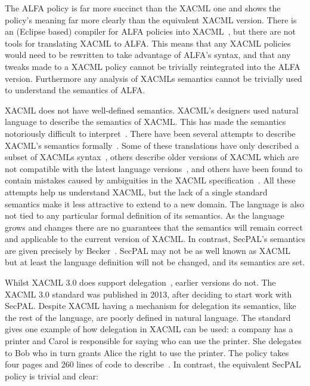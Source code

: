 \documentclass[thesis.tex]{subfiles}
\begin{document}
The ALFA policy is far more succinct than the XACML one and shows the
policy's meaning far more clearly than the equivalent XACML version.
There is an (Eclipse based) compiler for ALFA policies into
XACML~\cite{axiomaics_axiomatics_2012}, but there are not tools for
translating XACML to ALFA.  This means that any XACML policies would
need to be rewritten to take advantage of ALFA's syntax, and that any
tweaks made to a XACML policy cannot be trivially reintegrated into
the ALFA version.  Furthermore any analysis of XACMLs semantics cannot
be trivially used to understand the semantics of ALFA.

XACML does not have well-defined semantics. XACML's designers used
natural language to describe the semantics of XACML. This has made the
semantics notoriously difficult to
interpret~\cite{ramli_detecting_2015}. There have been several
attempts to describe XACML's semantics
formally~\cite{ramli_xacml_2012,ramli_logic_2014,bryans_reasoning_2005}. Some
of these translations have only described a subset of XACMLs
syntax~\cite{halpern_using_2008}, others describe older versions of
XACML which are not compatible with the latest language
versions~\cite{ahn_reasoning_2010}, and others have been found to
contain mistakes caused by ambiguities in the XACML
specification~\cite{bruns_access-control_2008,halpern_using_2008}.
All these attempts help us understand XACML, but the lack of a single
standard semantics make it less attractive to extend to a new domain.
The language is also not tied to any particular formal definition of
its semantics.  As the language grows and changes there are no
guarantees that the semantics will remain correct and applicable to
the current version of XACML. In contrast, SecPAL's semantics are
given precisely by Becker~\cite{becker_secpal:_2010}.  SecPAL may not
be as well known as XACML but at least the language definition will
not be changed, and its semantics are set.

Whilst XACML 3.0 does support delegation~\cite{oasis_xacml_2010},
earlier versions do not. The XACML 3.0 standard was published in 2013,
after deciding to start work with SecPAL.  Despite XACML having a
mechanism for delegation its semantics, like the rest of the language,
are poorly defined in natural language.  The standard gives one
example of how delegation in XACML can be used: a company has a
printer and Carol is responsible for saying who can use the printer.
She delegates to Bob who in turn grants Alice the right to use the
printer.  The policy takes four pages and 260 lines of code to
describe~\cite{oasis_xacml_2010}.  In contrast, the equivalent SecPAL
policy is trivial and clear:
\end{document}
